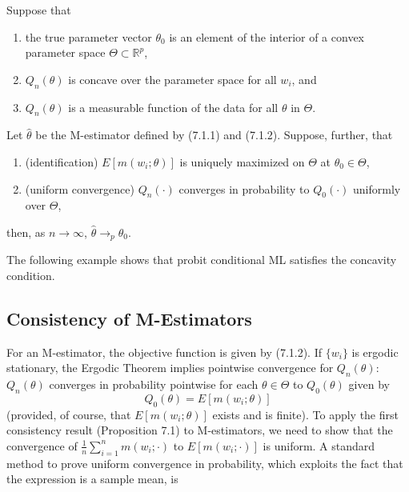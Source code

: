 \begin{proposition}
Suppose that
\begin{enumerate}
    \item the true parameter vector $\theta_0$ is an element of the interior of a convex parameter space $\Theta \subset \mathbb{R}^p$,
    \item $Q_n(\theta)$ is concave over the parameter space for all $w_i$, and
    \item $Q_n(\theta)$ is a measurable function of the data for all $\theta$ in $\Theta$.
\end{enumerate}
Let $\hat{\theta}$ be the M-estimator defined by (7.1.1) and (7.1.2). Suppose, further, that
\begin{enumerate}
    \item (identification) $E[m(w_i; \theta)]$ is uniquely maximized on $\Theta$ at $\theta_0 \in \Theta$,
    \item (uniform convergence) $Q_n(\cdot)$ converges in probability to $Q_0(\cdot)$ uniformly over $\Theta$,
\end{enumerate}
then, as $n \to \infty$, $\hat{\theta} \to_p \theta_0$.

The following example shows that probit conditional ML satisfies the concavity condition.

\subsection{Consistency of M-Estimators}
For an M-estimator, the objective function is given by (7.1.2). If $\{w_i\}$ is ergodic stationary, the Ergodic Theorem implies pointwise convergence for $Q_n(\theta)$: $Q_n(\theta)$ converges in probability pointwise for each $\theta \in \Theta$ to $Q_0(\theta)$ given by
\begin{equation}
Q_0(\theta) = E[m(w_i; \theta)]
\end{equation}
(provided, of course, that $E[m(w_i; \theta)]$ exists and is finite). To apply the first consistency result (Proposition 7.1) to M-estimators, we need to show that the convergence of $\frac{1}{n} \sum_{i=1}^n m(w_i; \cdot)$ to $E[m(w_i; \cdot)]$ is uniform. A standard method to prove uniform convergence in probability, which exploits the fact that the expression is a sample mean, is


\end{proposition}
